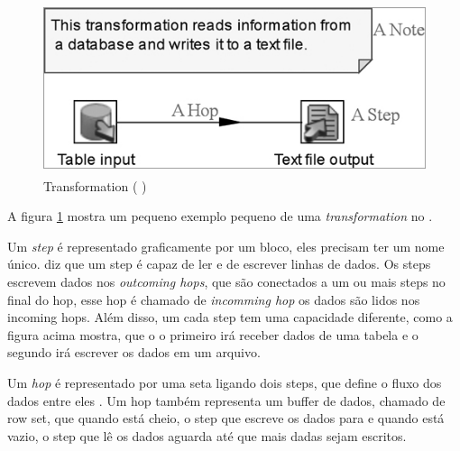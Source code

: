 \begin{figure}[H]
\centering
\includegraphics[height=5cm]{imagens/transformation.png}
\caption{Transformation (\citeauthor{kettle} \citeyear{kettle})}
\label{fig:transformation}
\end{figure}

A figura \ref{fig:transformation} mostra um pequeno exemplo pequeno de uma \textit{transformation} no \pdi.

Um \textit{step} é representado graficamente por um bloco, eles precisam ter um nome único.  diz que um step é capaz de ler e de escrever linhas de dados. Os steps escrevem dados nos \textit{outcoming hops}, que são conectados a um ou mais steps no final do hop, esse hop é chamado de \textit{incomming hop} os dados são lidos nos incoming hops. Além disso, um cada step tem uma capacidade diferente, como a figura acima mostra, que o o primeiro irá receber dados de uma tabela e o segundo irá escrever os dados em um arquivo.

Um \textit{hop} é representado por uma seta ligando dois steps, que define o fluxo dos dados entre eles \citep{kettle}. Um hop também representa um buffer de dados, chamado de row set, que quando está cheio, o step que escreve os dados para e quando está vazio, o step que lê os dados aguarda até que mais dadas sejam escritos.

